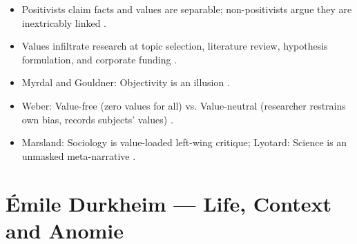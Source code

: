 \begin{QuickRevision}
\begin{itemize}
    \item Positivists claim facts and values are separable; non-positivists argue they are inextricably linked .
    \item Values infiltrate research at topic selection, literature review, hypothesis formulation, and corporate funding .
    \item Myrdal and Gouldner: Objectivity is an illusion .
    \item Weber: Value-free (zero values for all) vs. Value-neutral (researcher restrains own bias, records subjects' values) .
    \item Marsland: Sociology is value-loaded left-wing critique; Lyotard: Science is an unmasked meta-narrative .
\end{itemize}
\end{QuickRevision}

\sectiondivider

\section{Émile Durkheim --- Life, Context and Anomie}

